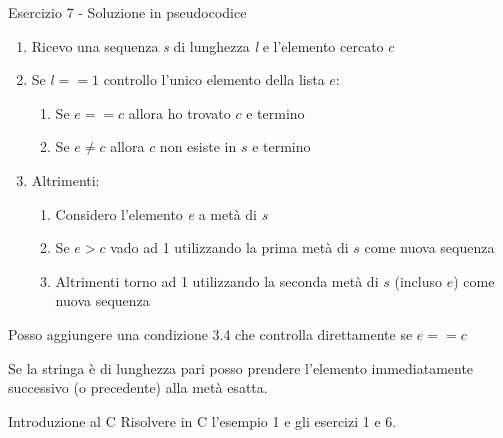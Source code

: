 \documentclass[handout]{beamer}
\begin{document}
\begin{frame}{Esercizio 7 - Soluzione in pseudocodice}
\begin{enumerate}
	\item Ricevo una sequenza \emph{s} di lunghezza \emph{l} e l'elemento cercato $c$
	\item Se $l == 1$ controllo l'unico elemento della lista $e$:
	\begin{enumerate}
		\item Se $e==c$ allora ho trovato $c$ e termino
		\item Se $e\neq c$ allora $c$ non esiste in $s$ e termino
	\end{enumerate}
	\item Altrimenti:
	\begin{enumerate}
		\item Considero l'elemento \emph{e} a metà di \emph{s}
		\item Se $e > c$ vado ad 1 utilizzando la prima metà di $s$ come nuova sequenza
		\item Altrimenti torno ad 1 utilizzando la seconda metà di $s$ (incluso $e$) come nuova sequenza
	\end{enumerate}
\end{enumerate}

Posso aggiungere una condizione 3.4 che controlla direttamente se $e == c$

Se la stringa è di lunghezza pari posso prendere l'elemento immediatamente successivo (o precedente) alla metà esatta.
\end{frame}

\begin{frame}{Introduzione al C}
Risolvere in C l'esempio 1 e gli esercizi 1 e 6.
\end{frame}
\end{document}
